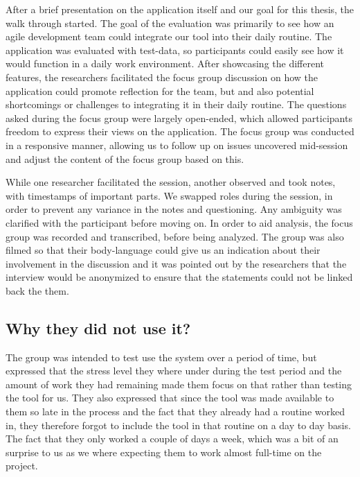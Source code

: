 After a brief presentation on the application itself and our goal for this thesis, the walk through started. The goal of the evaluation was primarily to see how an agile development team could integrate our tool into their daily routine. The application was evaluated with test-data, so participants could easily see how it would function in a daily work environment. After showcasing the different features, the researchers facilitated the focus group discussion on how the application could promote reflection for the team, but and also potential shortcomings or challenges to integrating it in their daily routine. The questions asked during the focus group were largely open-ended, which allowed participants freedom to express their views on the application\citep{yin2008case}. The focus group was conducted in a responsive manner, allowing us to follow up on issues uncovered mid-session and adjust the content of the focus group based on this\citep{rubin2011qualitative, wengraf2001qualitative}.

While one researcher facilitated the session, another observed and took notes, with timestamps of important parts. We swapped roles during the session, in order to prevent any variance in the notes and questioning. Any ambiguity was clarified with the participant before moving on. In order to aid analysis, the focus group was recorded and transcribed, before being analyzed. The group was also filmed so that their body-language could give us an indication about their involvement in the discussion and it was pointed out by the researchers that the interview would be anonymized to ensure that the statements could not be linked back the them.

\subsection{Why they did not use it?}
The group was intended to test use the system over a period of time, but expressed that the stress level they where under during the test period and the amount of work they had remaining made them focus on that rather than testing the tool for us. They also expressed that since the tool was made available to them so late in the process and the fact that they already had a routine worked in, they therefore forgot to include the tool in that routine on a day to day basis. The fact that they only worked a couple of days a week, which was a bit of an surprise to us as we where expecting them to work almost full-time on the project.

